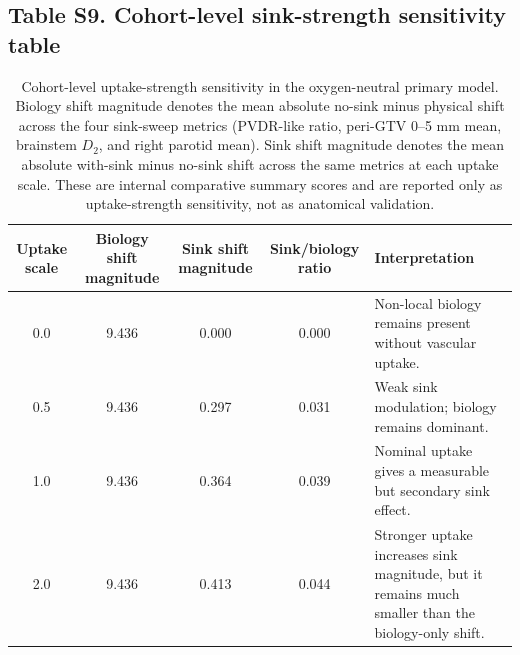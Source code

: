 \documentclass[10pt,a4paper]{article}
\begin{document}
\subsection{Table S9. Cohort-level sink-strength sensitivity table}
\begin{table}[H]
\centering
\caption{Cohort-level uptake-strength sensitivity in the oxygen-neutral primary model. Biology shift magnitude denotes the mean absolute no-sink minus physical shift across the four sink-sweep metrics (PVDR-like ratio, peri-GTV 0--5 mm mean, brainstem $D_2$, and right parotid mean). Sink shift magnitude denotes the mean absolute with-sink minus no-sink shift across the same metrics at each uptake scale. These are internal comparative summary scores and are reported only as uptake-strength sensitivity, not as anatomical validation.}
\label{tab:s9_uptake_strength_sensitivity}
\footnotesize
\setlength{\tabcolsep}{4pt}
\begin{tabularx}{\linewidth}{c c c c X}
\toprule
Uptake scale & Biology shift magnitude & Sink shift magnitude & Sink/biology ratio & Interpretation \\
\midrule
0.0 & 9.436 & 0.000 & 0.000 & Non-local biology remains present without vascular uptake. \\
0.5 & 9.436 & 0.297 & 0.031 & Weak sink modulation; biology remains dominant. \\
1.0 & 9.436 & 0.364 & 0.039 & Nominal uptake gives a measurable but secondary sink effect. \\
2.0 & 9.436 & 0.413 & 0.044 & Stronger uptake increases sink magnitude, but it remains much smaller than the biology-only shift. \\
\bottomrule
\end{tabularx}
\end{table}
\end{document}
